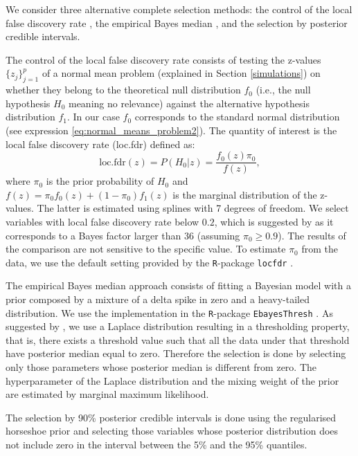 \documentclass[a4]{article}
\theoremstyle{definition}
\begin{document}
We consider three alternative complete selection methods:
 the control of the local
false discovery rate \citep{paper:efron, efron2012large}, the
empirical Bayes median \citep{johnstone2004needles}, and the selection
by posterior credible intervals.

The control of the local false discovery rate consists of testing the
z-values $\{z_{j}\}_{j=1}^{p}$ of a normal mean problem (explained in Section \ref{simulations}) 
on whether they belong to the
theoretical null distribution $f_{0}$ (i.e., the null hypothesis $H_0$
meaning no relevance) against the alternative hypothesis distribution
$f_{1}$. In our case $f_{0}$ corresponds to the standard normal
distribution (see expression \eqref{eq:normal_means_problem2}). The
quantity of interest is the local false discovery rate (loc.fdr)
defined as: \
\begin{equation}
\text{loc.fdr}(z)=P(H_{0}|z)=\frac{f_{0}(z)\pi_{0}}{f(z)},
\end{equation}
where $\pi_{0}$ is the prior probability of $H_0$ and
$f(z)=\pi_{0}f_{0}(z)+(1-\pi_{0})f_{1}(z)$ is the marginal
distribution of the z-values. The latter is estimated using splines
with 7 degrees of freedom. We select variables with local false
discovery rate below $0.2$, which is suggested by
\citet{efron2012large} as it corresponds to a Bayes factor larger than
36 (assuming $\pi_{0}\geq0.9$). The results of the comparison are not
sensitive to the specific value. To estimate $\pi_{0}$ from the data,
we use the default setting provided by the \texttt{R}-package
\texttt{locfdr} \citep{Efron+Turnbull+Narasimhan:2015:locfdr, Rlocfdr}.

The empirical Bayes median approach consists of fitting a Bayesian
model with a prior composed by a mixture of a delta spike in zero and
a heavy-tailed distribution. We use the implementation in the
\texttt{R}-package \texttt{EbayesThresh}
\citep{Silverman+etal:2017:EbayesThresh, REbayesThresh}. As suggested by
\cite{johnstone2004needles}, we use a Laplace distribution resulting
in a thresholding property, that is, there exists a threshold value
such that all the data under that threshold have posterior median
equal to zero. Therefore the selection is done by selecting only those
parameters whose posterior median is different from zero. The
hyperparameter of the Laplace distribution and the mixing weight of
the prior are estimated by marginal maximum likelihood.

The selection
by 90\% posterior credible intervals is done using the regularised
horseshoe prior \Citep{paper:rhs} and selecting those variables whose posterior
distribution does not include zero in the interval between the 5\% and
the 95\% quantiles.
\end{document}
